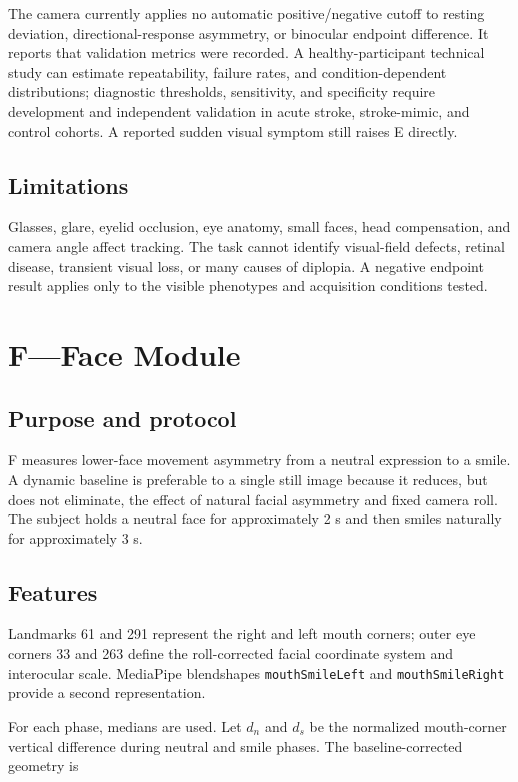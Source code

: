 \documentclass[11pt,a4paper]{article}
\begin{document}
The camera currently applies no automatic positive/negative cutoff to resting deviation, directional-response asymmetry, or binocular endpoint difference. It reports that validation metrics were recorded. A healthy-participant technical study can estimate repeatability, failure rates, and condition-dependent distributions; diagnostic thresholds, sensitivity, and specificity require development and independent validation in acute stroke, stroke-mimic, and control cohorts. A reported sudden visual symptom still raises E directly.

\subsection{Limitations}

Glasses, glare, eyelid occlusion, eye anatomy, small faces, head compensation, and camera angle affect tracking. The task cannot identify visual-field defects, retinal disease, transient visual loss, or many causes of diplopia. A negative endpoint result applies only to the visible phenotypes and acquisition conditions tested.

\section{F---Face Module}

\subsection{Purpose and protocol}

F measures lower-face movement asymmetry from a neutral expression to a smile. A dynamic baseline is preferable to a single still image because it reduces, but does not eliminate, the effect of natural facial asymmetry and fixed camera roll. The subject holds a neutral face for approximately 2 s and then smiles naturally for approximately 3 s.

\subsection{Features}

Landmarks 61 and 291 represent the right and left mouth corners; outer eye corners 33 and 263 define the roll-corrected facial coordinate system and interocular scale. MediaPipe blendshapes \texttt{mouthSmileLeft} and \texttt{mouthSmileRight} provide a second representation.

For each phase, medians are used. Let $d_n$ and $d_s$ be the normalized mouth-corner vertical difference during neutral and smile phases. The baseline-corrected geometry is
\end{document}
